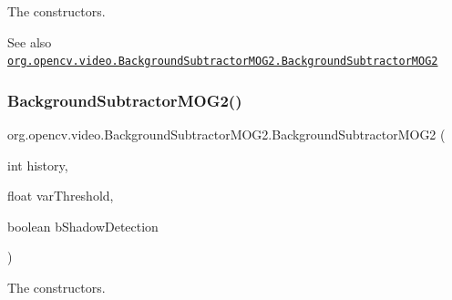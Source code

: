 The constructors.

\begin{DoxySeeAlso}{See also}
\href{http://docs.opencv.org/modules/video/doc/motion_analysis_and_object_tracking.html#backgroundsubtractormog2-backgroundsubtractormog2}{\tt org.\+opencv.\+video.\+Background\+Subtractor\+M\+O\+G2.\+Background\+Subtractor\+M\+O\+G2} 
\end{DoxySeeAlso}
\mbox{\label{classorg_1_1opencv_1_1video_1_1_background_subtractor_m_o_g2_a59eebcd3dbe21ecae1712afc5b2a9734}} 
\subsubsection{\texorpdfstring{Background\+Subtractor\+M\+O\+G2()}{BackgroundSubtractorMOG2()}\hspace{0.1cm}{\footnotesize\ttfamily [3/4]}}
{\footnotesize\ttfamily org.\+opencv.\+video.\+Background\+Subtractor\+M\+O\+G2.\+Background\+Subtractor\+M\+O\+G2 (\begin{DoxyParamCaption}\item[{int}]{history,  }\item[{float}]{var\+Threshold,  }\item[{boolean}]{b\+Shadow\+Detection }\end{DoxyParamCaption})}

The constructors.


